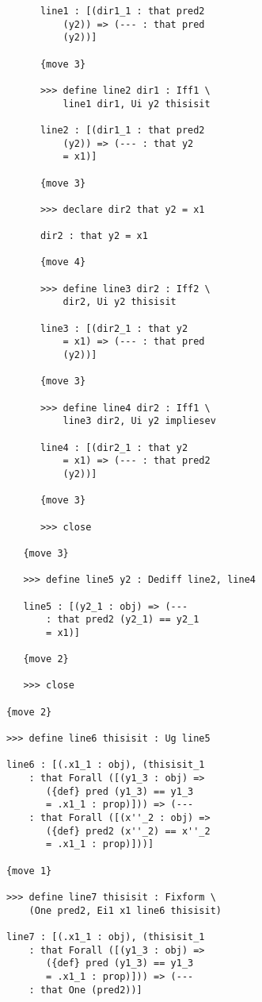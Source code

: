 \documentclass[12pt]{article}
\begin{document}
\begin{verbatim}
            line1 : [(dir1_1 : that pred2 
                (y2)) => (--- : that pred 
                (y2))]

            {move 3}

            >>> define line2 dir1 : Iff1 \
                line1 dir1, Ui y2 thisisit

            line2 : [(dir1_1 : that pred2 
                (y2)) => (--- : that y2 
                = x1)]

            {move 3}

            >>> declare dir2 that y2 = x1

            dir2 : that y2 = x1

            {move 4}

            >>> define line3 dir2 : Iff2 \
                dir2, Ui y2 thisisit

            line3 : [(dir2_1 : that y2 
                = x1) => (--- : that pred 
                (y2))]

            {move 3}

            >>> define line4 dir2 : Iff1 \
                line3 dir2, Ui y2 impliesev

            line4 : [(dir2_1 : that y2 
                = x1) => (--- : that pred2 
                (y2))]

            {move 3}

            >>> close

         {move 3}

         >>> define line5 y2 : Dediff line2, line4

         line5 : [(y2_1 : obj) => (--- 
             : that pred2 (y2_1) == y2_1 
             = x1)]

         {move 2}

         >>> close

      {move 2}

      >>> define line6 thisisit : Ug line5

      line6 : [(.x1_1 : obj), (thisisit_1 
          : that Forall ([(y1_3 : obj) => 
             ({def} pred (y1_3) == y1_3 
             = .x1_1 : prop)])) => (--- 
          : that Forall ([(x''_2 : obj) => 
             ({def} pred2 (x''_2) == x''_2 
             = .x1_1 : prop)]))]

      {move 1}

      >>> define line7 thisisit : Fixform \
          (One pred2, Ei1 x1 line6 thisisit)

      line7 : [(.x1_1 : obj), (thisisit_1 
          : that Forall ([(y1_3 : obj) => 
             ({def} pred (y1_3) == y1_3 
             = .x1_1 : prop)])) => (--- 
          : that One (pred2))]


\end{verbatim}
\end{document}
